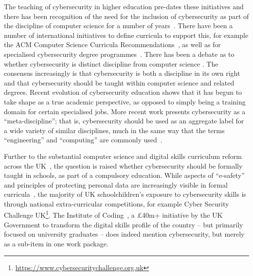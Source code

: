\documentclass[conference]{IEEEtran}
\begin{document}
The teaching of cybersecurity in higher education pre-dates these initiatives and there has been recognition of the need for the inclusion of cybersecurity as part of the discipline of computer science for a number of years~\cite{Hentea2006,schneider2013}. There have been a number of international initiatives to define curricula to support this, for example the ACM Computer Science Curricula Recommendations~\cite[which added ``Information Assurance and Security'' for the first time]{ACM2013a}, as well as for specialised cybersecurity degree programmes~\cite{ACMIEEEAISSIGSECIFIP}. There has been a debate as to whether cybersecurity is distinct discipline from computer science \cite{McGettrick2013}. The consensus increasingly is that cybersecurity is both a discipline in its own right and that cybersecurity should be taught within computer science and related degrees. Recent evolution of cybersecurity education shows that it has begun to take shape as a true academic perspective, as opposed to simply being a training domain for certain specialised jobs. More recent work presents cybersecurity as a ``meta-discipline''; that is, cybersecurity should be used as an aggregate label for a wide variety of similar disciplines, much in the same way that the terms ``engineering'' and ``computing'' are commonly used~\cite{Parrishetal2018b}. 

Further to the substantial computer science and digital skills curriculum reform across the UK~\cite{wgictreview:2013,brown-et-al:toce2014,tryfonas+crick:petra2018}, the question is raised whether cybersecurity should be formally taught in schools, as part of a compulsory education. While aspects of ``e-safety'' and principles of protecting personal data are increasingly visible in formal curricula~\cite{moller+crick:jce2018}, the majority of UK schoolchildren's exposure to cybersecurity skills is through national extra-curricular competitions, for example Cyber Security Challenge UK\footnote{\url{https://www.cybersecuritychallenge.org.uk}}. The Institute of Coding~\cite{Davenportetal2019a}, a \pounds40m+ initiative by the UK Government to transform the digital skills profile of the country -- but primarily focused on university graduates -- does indeed mention cybersecurity, but merely as a sub-item in one work package.

\end{document}
